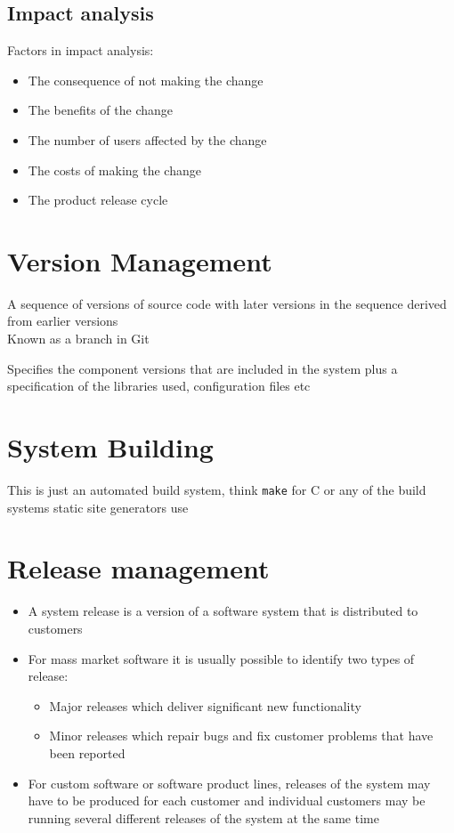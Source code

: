 \documentclass{article}[18pt]
\begin{document}
\subsection{Impact analysis}
Factors in impact analysis:
\begin{itemize}
	\item The consequence of not making the change
	\item The benefits of the change
	\item The number of users affected by the change
	\item The costs of making the change
	\item The product release cycle
\end{itemize}
\newpage
\section{Version Management}
\begin{definition}[Codelines]
A sequence of versions of source code with later versions in the sequence derived from earlier versions\\
Known as a branch in Git
\end{definition}
\begin{definition}[Baselines]
Specifies the component versions that are included in the system plus a specification of the libraries used, configuration files etc
\end{definition}
\section{System Building}
This is just an automated build system, think \texttt{make} for C or any of the build systems static site generators use
\section{Release management}
\begin{itemize}
	\item A system release is a version of a software system that is distributed to customers
	\item For mass market software it is usually possible to identify two types of release:
	\begin{itemize}
		\item Major releases which deliver significant new functionality
		\item Minor releases which repair bugs and fix customer problems that have been reported
	\end{itemize}
	\item For custom software or software product lines, releases of the system may have to be produced for each customer and individual customers may be running several different releases of the system at the same time
\end{itemize}
\end{document}
